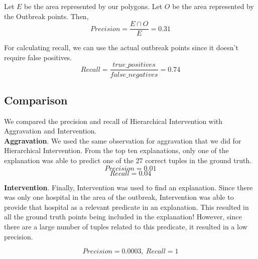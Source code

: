 Let $E$ be the area represented by our polygons. Let $O$ be the area represented by the Outbreak points. Then,
$$Precision = \frac{E \cap O}{E} = 0.31$$

For calculating recall, we can use the actual outbreak points since it doesn't require false positives.
$$Recall = \frac{true\_positives}{false\_negatives} = 0.74$$




\subsection{Comparison}
We compared the precision and recall of Hierarchical Intervention with Aggravation and Intervention.
\\
\textbf{Aggravation}. We used the same observation for aggravation that we did for Hierarchical Intervention. From the top ten explanations, only one of the explanation was able to predict one of the 27 correct tuples in the ground truth.
$$Precision = 0.01$$
$$Recall = 0.04$$


\textbf{Intervention}. Finally, Intervention was used to find an explanation. Since there was only one hospital in the area of the outbreak, Intervention was able to provide that hospital as a relevant predicate in an explanation. This resulted in all the ground truth points being included in the explanation! However, since there are a large number of tuples related to this predicate, it resulted in a low precision.

$$Precision = 0.0003,\ Recall = 1$$









